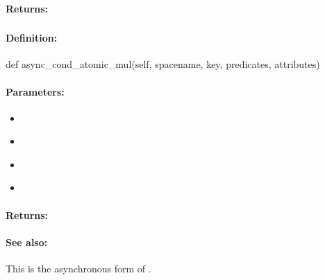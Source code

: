 \paragraph{Returns:}


\pagebreak
\subsubsection{}
\label{api:python:async_cond_atomic_mul}


\paragraph{Definition:}
\begin{pythoncode}
def async_cond_atomic_mul(self, spacename, key, predicates, attributes)
\end{pythoncode}

\paragraph{Parameters:}
\begin{itemize}[noitemsep]
\item {}\\

\item {}\\

\item {}\\

\item {}\\

\end{itemize}

\paragraph{Returns:}


\paragraph{See also:}  This is the asynchronous form of .

